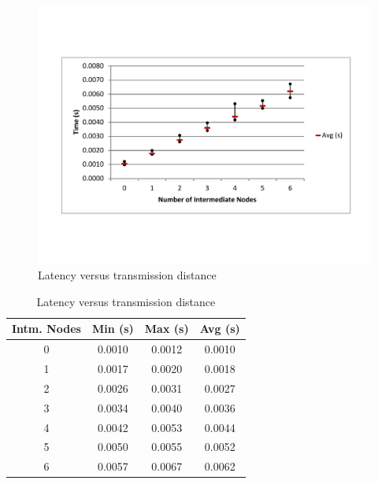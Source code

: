 \begin{figure}[ptb]
	\begin{centering}
		\includegraphics[width=6in]{Protocol/Figures/protocol-latency_vs_distance.pdf}
		\caption{Latency versus transmission distance}
		\label{fig:protocol:latency_vs_distance}
	\end{centering}
\end{figure}

\begin{table}
	\begin{center}
		\setlength{\extrarowheight}{1.5pt}
		\caption{Latency versus transmission distance}
		\vspace{0.1cm}
		\begin{tabular} {|c|c|c|c|}
			\hline
			\textbf{Intm. Nodes} & \textbf{Min (s)} & \textbf{Max (s)} & \textbf{Avg (s)} \\
			\hline
			\hline
			0 & 0.0010 & 0.0012 & 0.0010 \\
			\hline
			1 & 0.0017 & 0.0020 & 0.0018 \\
			\hline
			2 & 0.0026 & 0.0031 & 0.0027 \\
			\hline
			3 & 0.0034 & 0.0040 & 0.0036 \\
			\hline
			4 & 0.0042 & 0.0053 & 0.0044 \\
			\hline
			5 & 0.0050 & 0.0055 & 0.0052 \\
			\hline
			6 & 0.0057 & 0.0067 & 0.0062 \\
			\hline
		\end{tabular}
		\label{tab:protocol:latency_vs_distance}
	\end{center}
\end{table}

